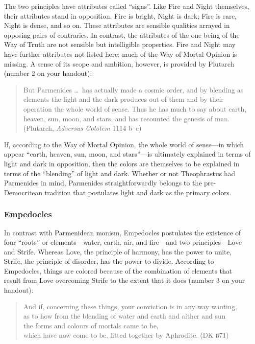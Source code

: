 The two principles have attributes called ``signs''. Like Fire and Night themselves, their attributes stand in opposition. Fire is bright, Night is dark; Fire is rare, Night is dense, and so on. These attributes are sensible qualities arrayed in opposing pairs of contraries. In contrast, the attributes of the one being of the Way of Truth are not sensible but intelligible properties. Fire and Night may have further attributes not listed here; much of the Way of Mortal Opinion is missing. A sense of its scope and ambition, however, is provided by Plutarch (number 2 on your handout):
\begin{quote}
    But Parmenides \ldots\ has actually made a cosmic order, and by blending as elements the light and the dark produces out of them and by their operation the whole world of sense. Thus he has much to say about earth, heaven, sun, moon, and stars, and has recounted the genesis of man. (Plutarch, \emph{Adversus Colotem} 1114 b--c)
\end{quote}
If, according to the Way of Mortal Opinion, the whole world of sense---in which appear ``earth, heaven, sun, moon, and stars''---is ultimately explained in terms of light and dark in opposition, then the colors are themselves to be explained in terms of the ``blending'' of light and dark. Whether or not Theophrastus had Parmenides in mind, Parmenides straightforwardly belongs to the pre-Democritean tradition that postulates light and dark as the primary colors. \change


\begin{frame}[t]\frametitle{Empedocles}
	
\end{frame}


In contrast with Parmenidean monism, Empedocles postulates the existence of four ``roots'' or elements---water, earth, air, and fire---and two principles---\-Love and Strife. Whereas Love, the principle of harmony, has the power to unite, Strife, the principle of disorder, has the power to divide. According to Empedocles, things are colored because of the combination of elements that result from Love overcoming Strife to the extent that it does (number 3 on your handout):
\begin{verse}
    And if, concerning these things, your conviction is in any way wanting,\\
    as to how from the blending of water and earth and aither and sun\\
    the forms and colours of mortals came to be,\\
    which have now come to be, fitted together by Aphrodite.
    (DK \textsc{b}71)
\end{verse}

